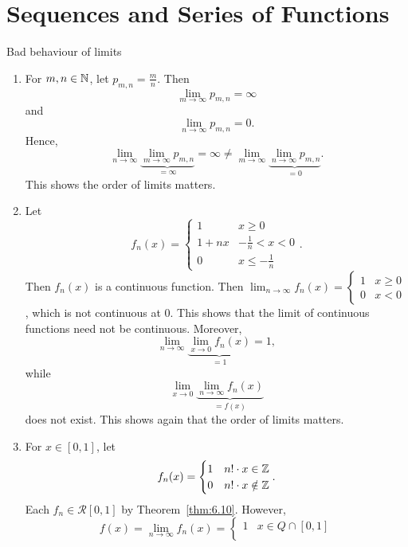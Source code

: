 \chapter{Sequences and Series of Functions}
\begin{example}
	\label{eg:7.1}
	Bad behaviour of limits
	\begin{enumerate}[label=(\arabic*)]
		\item For $m,n \in \mathbb{N}$, let $p_{m,n}=\frac{m}{n}$.
		      Then
		      \[
			      \lim_{m\to \infty}{p_{m,n}}=\infty
		      \]
		      and
		      \[
			      \lim_{n\to \infty}{p_{m,n}}=0
			      .\]
		      Hence,
		      \[
			      \lim_{n\to \infty}{\underbrace{\lim_{m\to \infty}{p_{m,n}}}_{=\infty}}=\infty \neq \lim_{m\to \infty}{\underbrace{\lim_{n\to \infty}{p_{m,n}}}_{=0}}
			      .\]
		      This shows the order of limits matters.
		\item Let
		      \[
			      f_n(x)=
			      \begin{cases}
				      1    & x\ge 0            \\
				      1+nx & -\frac{1}{n}<x<0  \\
				      0    & x\le -\frac{1}{n}
			      \end{cases}
			      .\]
		      Then $f_n(x)$ is a continuous function.
		      Then $\lim_{n\to \infty}{f_n(x)}= \begin{cases}
				      1 & x\ge 0 \\
				      0 & x<0
			      \end{cases}$, which is not continuous at $0$.
		      This shows that the limit of continuous functions need not be continuous.
		      Moreover,
		      \[
			      \lim_{n\to \infty}{\underbrace{\lim_{x\to 0}{f_{n}(x)}}_{=1}}=1
			      ,\]
		      while
		      \[
			      \lim_{x\to 0}{\underbrace{\lim_{n\to \infty}{f_{n}(x)}}_{=f(x)}}
		      \]
		      does not exist. This shows again that the order of limits matters.
		\item
		      For $x \in [0,1]$, let \[
			      f_n(x)= \begin{cases}
				      1 & n!\cdot x \in \mathbb{Z}    \\
				      0 & n!\cdot x \notin \mathbb{Z} \\
			      \end{cases}
			      .\]
		      Each $f_n \in \mathscr{R}[0,1]$ by Theorem~\ref{thm:6.10}.
		      However, \[
			      f(x)=\lim_{n\to \infty}{f_n(x)}= \begin{cases}
				      1 & x \in Q \cap [0,1]    \\

\end{cases}\]
\end{enumerate}
\end{example}
